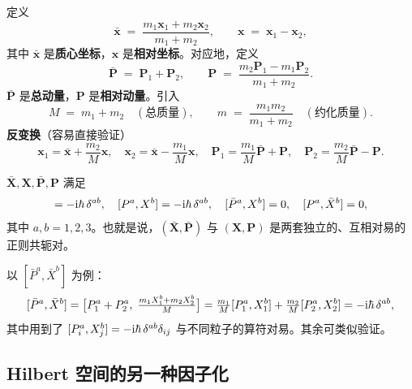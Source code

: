 定义
\begin{equation}
  \bar{\bm{x}} \;=\; \frac{m_1\bm{x}_1 + m_2\bm{x}_2}{m_1 + m_2}, \qquad
  \bm{x} \;=\; \bm{x}_1 - \bm{x}_2,
  \label{eq:CM-rel-coords}
\end{equation}
其中 $\bar{\bm{x}}$ 是\textbf{质心坐标}，$\bm{x}$ 是\textbf{相对坐标}。对应地，定义
\begin{equation}
  \bar{\bm{P}} \;=\; \bm{P}_1 + \bm{P}_2,\qquad
  \bm{P} \;=\; \frac{m_2\bm{P}_1 - m_1\bm{P}_2}{m_1+m_2}.
  \label{eq:CM-rel-momenta}
\end{equation}
$\bar{\bm{P}}$ 是\textbf{总动量}，$\bm{P}$ 是\textbf{相对动量}。引入
\begin{equation}
  M \;=\; m_1+m_2 \quad (\text{总质量}), \qquad
  m \;=\; \frac{m_1 m_2}{m_1+m_2} \quad (\text{约化质量}).
  \label{eq:total-reduced-mass}
\end{equation}
\textbf{反变换}（容易直接验证）
\begin{equation}
  \bm{x}_1 = \bar{\bm{x}} + \frac{m_2}{M}\bm{x},\quad
  \bm{x}_2 = \bar{\bm{x}} - \frac{m_1}{M}\bm{x},\quad
  \bm{P}_1 = \frac{m_1}{M}\bar{\bm{P}} + \bm{P},\quad
  \bm{P}_2 = \frac{m_2}{M}\bar{\bm{P}} - \bm{P}.
\end{equation}

\begin{proposition}[新坐标系下的正则对易关系]
  $\bar{\bm{X}},\bm{X},\bar{\bm{P}},\bm{P}$ 满足
  \begin{equation}
    [\bar{P}^a,\bar{X}^b]=-\rmi\hbar\,\delta^{ab},\quad
    [P^a,X^b]=-\rmi\hbar\,\delta^{ab},\quad
    [\bar{P}^a,X^b]=0,\quad [P^a,\bar{X}^b]=0,
    \label{eq:CCR-CM-rel}
  \end{equation}
  其中 $a,b=1,2,3$。也就是说，$(\bar{\bm{X}},\bar{\bm{P}})$ 与 $(\bm{X},\bm{P})$ 是两套独立的、互相对易的正则共轭对。
\end{proposition}

\begin{proof*}
  以 $[\bar{P}^a,\bar{X}^b]$ 为例：
  \[
    [\bar P^a,\bar X^b]
    = \bigl[P_1^a+P_2^a,\;\tfrac{m_1 X_1^b + m_2 X_2^b}{M}\bigr]
    = \tfrac{m_1}{M}[P_1^a,X_1^b] + \tfrac{m_2}{M}[P_2^a,X_2^b]
    = -\mathrm{i}\hbar\,\delta^{ab},
  \]
  其中用到了 $[P_i^a,X_j^b]=-\mathrm{i}\hbar\,\delta^{ab}\delta_{ij}$ 与不同粒子的算符对易。其余可类似验证。
\end{proof*}

\subsection{Hilbert 空间的另一种因子化}


